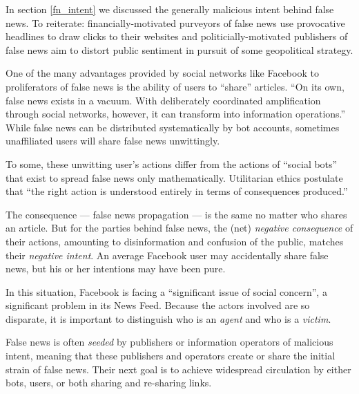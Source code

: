 \label{investigation}

\par In section \ref{fn_intent} we discussed the generally malicious intent behind false news. To reiterate: financially-motivated purveyors of false news use provocative headlines to draw clicks to their websites \cite{bbc_clickbait} and politicially-motivated publishers of false news aim to distort public sentiment in pursuit of some geopolitical strategy. \cite{fb_info_ops} 


\par One of the many advantages provided by social networks like Facebook to proliferators of false news is the ability of users to ``share'' articles. \cite{nyt_case_study} ``On its own, false news exists in a vacuum. With deliberately coordinated amplification through social networks, however, it can transform into information operations.'' \cite{fb_info_ops} While false news can be distributed systematically by bot accounts, \cite{cbs_fn} sometimes unaffiliated users will share false news unwittingly. \cite{fb_info_ops}


\par To some, these unwitting user's actions differ from the actions of ``social bots'' that exist to spread false news only mathematically. Utilitarian ethics postulate that ``the right action is understood entirely in terms of consequences produced.'' \cite{util}

\par The consequence --- false news propagation --- is the same no matter who shares an article. But
for the parties behind false news, the (net) \emph{negative consequence} of their actions, amounting to disinformation and confusion of the public, matches their \emph{negative intent}. An average Facebook user may accidentally share false news, but his or her intentions may have been pure.

\par In this situation, Facebook is facing a ``significant issue of social concern'', a significant problem in its News Feed. Because the actors involved are so disparate, it is important to distinguish who is an \emph{agent} and who is a \emph{victim}.


\par False news is often \emph{seeded} by publishers or information operators of malicious intent, meaning that these publishers and operators create or share the initial strain of false news. Their next goal is to achieve widespread circulation by either bots, users, or both sharing and re-sharing links. \cite{fb_info_ops}

